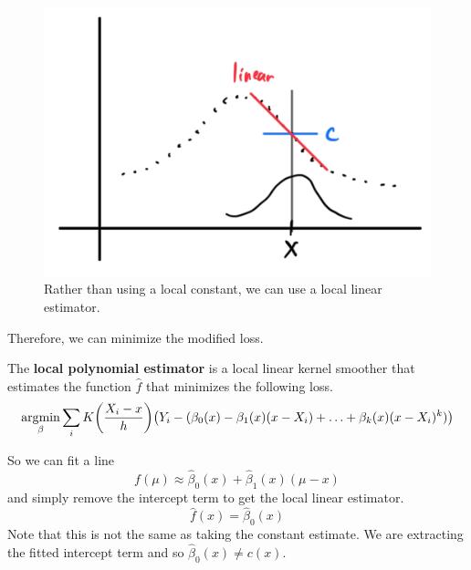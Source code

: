    \begin{figure}[H]
      \centering 
      \includegraphics[scale=0.4]{img/local_linear_estimator.png}
      \caption{Rather than using a local constant, we can use a local linear estimator.} 
      \label{fig:local_linear_estimator}
    \end{figure}

    Therefore, we can minimize the modified loss. 

    \begin{definition}
      The \textbf{local polynomial estimator} is a local linear kernel smoother that estimates the function $\hat{f}$ that minimizes the following loss. 
      \begin{equation}
        \argmin_{\beta} \sum_i K \bigg( \frac{X_i - x}{h} \bigg) \big( Y_i - (\beta_0 (x) - \beta_1 (x) (x- X_i) + \ldots + \beta_k (x) (x - X_i)^k )\big)
      \end{equation}
    \end{definition}

    So we can fit a line 
    \begin{equation}
      f(\mu) \approx \hat{\beta}_0 (x) + \hat{\beta}_1 (x) (\mu - x)
    \end{equation}
    and simply remove the intercept term to get the local linear estimator. 
    \begin{equation}
      \hat{f}(x) = \hat{\beta}_0 (x)
    \end{equation}
    Note that this is not the same as taking the constant estimate. We are extracting the fitted intercept term and so $\hat{\beta}_0(x) \neq c(x)$. 

